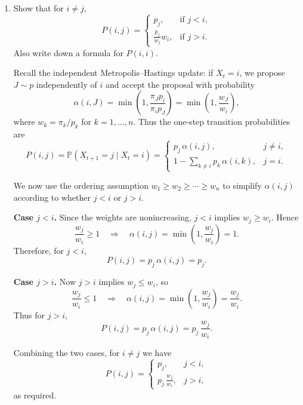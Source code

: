 \documentclass[answers,12pt,addpoints]{exam}
\begin{document}
\begin{enumerate}
\item Show that for $i \neq j$,
\[
P(i,j) =
\begin{cases}
p_j, & \text{if } j < i,\\[4pt]
\displaystyle \frac{p_j}{w_j} w_i, & \text{if } j > i.
\end{cases}
\]
Also write down a formula for $P(i,i)$.
\begin{solution}
Recall the independent Metropolis--Hastings update: if $X_t = i$, we propose
$J \sim p$ independently of $i$ and accept the proposal with probability
\[
\alpha(i,J)
= \min\!\left(1,\frac{\pi_J p_i}{\pi_i p_J}\right)
= \min\!\left(1,\frac{w_J}{w_i}\right),
\]
where $w_k = \pi_k/p_k$ for $k=1,\dots,n$. Thus the one-step transition
probabilities are
\[
P(i,j)
= \mathbb{P}(X_{t+1}=j \mid X_t=i)
=
\begin{cases}
p_j\,\alpha(i,j), & j \neq i,\\[4pt]
1 - \displaystyle\sum_{k\neq i} p_k\,\alpha(i,k), & j = i.
\end{cases}
\]

We now use the ordering assumption $w_1 \ge w_2 \ge \cdots \ge w_n$ to simplify
$\alpha(i,j)$ according to whether $j<i$ or $j>i$.

\medskip
\noindent\textbf{Case $j < i$.}
Since the weights are nonincreasing, $j<i$ implies $w_j \ge w_i$. Hence
\[
\frac{w_j}{w_i} \ge 1
\quad\Longrightarrow\quad
\alpha(i,j) = \min\!\left(1,\frac{w_j}{w_i}\right)
= 1.
\]
Therefore, for $j<i$,
\[
P(i,j) = p_j\,\alpha(i,j) = p_j.
\]

\medskip
\noindent\textbf{Case $j > i$.}
Now $j>i$ implies $w_j \le w_i$, so
\[
\frac{w_j}{w_i} \le 1
\quad\Longrightarrow\quad
\alpha(i,j) = \min\!\left(1,\frac{w_j}{w_i}\right)
= \frac{w_j}{w_i}.
\]
Thus for $j>i$,
\[
P(i,j) = p_j\,\alpha(i,j)
= p_j\,\frac{w_j}{w_i}.
\]

Combining the two cases, for $i\neq j$ we have
\[
P(i,j) =
\begin{cases}
p_j, & j < i,\\[4pt]
\displaystyle p_j\,\frac{w_j}{w_i}, & j > i,
\end{cases}
\]
as required.


\end{solution}
\end{enumerate}
\end{document}
